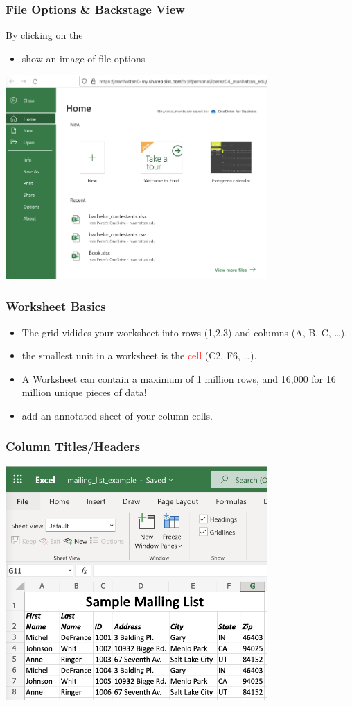 \documentclass[12pt]{beamer}
\begin{document}
	\begin{frame}
		\frametitle{File Options \& Backstage View}
		By clicking on the 
		\begin{itemize}
			\item show an image of file options
		\end{itemize}
		\begin{center}
			\includegraphics[width=10cm]{FileTab.png}
		\end{center}	
\end{frame}

	\begin{frame}
		\frametitle{Worksheet Basics}
		\begin{itemize}
			\item The grid vidides your worksheet into rows (1,2,3)
			and columns (A, B, C, \ldots).
			\item the smallest unit in a worksheet is the \textcolor{red}{cell} (C2, F6, \ldots).
			\item A Worksheet can contain a maximum of 1 million rows, and 16,000 for 16 million unique pieces of data!
			\item add an annotated sheet of your column cells.
		\end{itemize}
	\end{frame}
	
	\begin{frame}
		\frametitle{Column Titles/Headers}
		\begin{center}
		\includegraphics[width=10cm]{ExampleWorkbook}
		\end{center}
	\end{frame}
\end{document}

